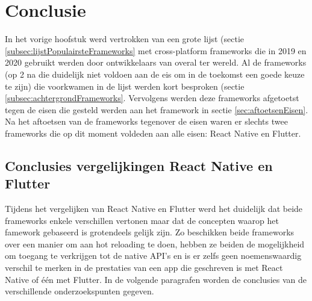 
\chapter{Conclusie}
\label{ch:conclusie}



In het vorige hoofstuk werd vertrokken van een grote lijst (sectie \ref{subsec:lijstPopulairsteFrameworks} met cross-platform frameworks die in 2019 en 2020 gebruikt werden door ontwikkelaars van overal ter wereld. Al de frameworks (op 2 na die duidelijk niet voldoen aan de eis om in de toekomst een goede keuze te zijn) die voorkwamen in de lijst werden kort besproken (sectie \ref{subsec:achtergrondFrameworks}. Vervolgens werden deze frameworks afgetoetst tegen de eisen die gesteld werden aan het framework in sectie \ref{sec:aftoetsenEisen}. Na het aftoetsen van de frameworks tegenover de eisen waren er slechts twee frameworks die op dit moment voldeden aan alle eisen: React Native en Flutter.

\section{Conclusies vergelijkingen React Native en Flutter}
\label{sec:conclusieVgl}

Tijdens het vergelijken van React Native en Flutter werd het duidelijk dat beide frameworks enkele verschillen vertonen maar dat de concepten waarop het famework gebaseerd is grotendeels gelijk zijn. Zo beschikken beide frameworks over een manier om aan hot reloading te doen, hebben ze beiden de mogelijkheid om toegang te verkrijgen tot de native API's en is er zelfs geen noemenswaardig verschil te merken in de prestaties van een app die geschreven is met React Native of één met Flutter. In de volgende paragrafen worden de conclusies van de verschillende onderzoekspunten gegeven.

